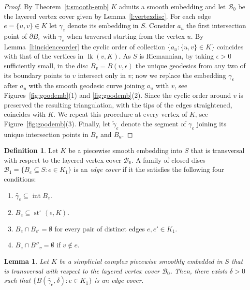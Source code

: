 \documentclass[11pt]{article}
\newtheorem{lemma}[theorem]{Lemma}
\numberwithin{claimcounter}{theorem}
\theoremstyle{remark}
\theoremstyle{definition}
\newtheorem{definition}[theorem]{Definition}
\numberwithin{theorem}{section}
\DeclareMathOperator{\st}{st}
\DeclareMathOperator{\interior}{int}
\DeclareMathOperator{\lk}{lk}
\begin{document}
\begin{proof}
    By Theorem~\ref{t:smooth-emb} $K$ admits a smooth embedding and 
    let $\mathcal{B}_0$ be the layered vertex cover given by Lemma~\ref{l:vertexdisc}. 
    For each edge $e=\{u,v\} \in K$ let $\gamma_e$ denote its embedding in $S$.
Consider $a_u$ the first intersection point of $\partial B_v$ with $\gamma_e$ when traversed starting from the vertex $u$.
By Lemma~\ref{l:incidenceorder} the cyclic order of collection $\{a_u\colon \{u,v\} \in K\}$ coincides with that of the vertices in $\lk(v,K)$.
As $S$ is Riemannian, by taking $\epsilon>0$ sufficiently small, in the disc $B_v=B(v,\epsilon)$ the unique geodesics from any two of its boundary points to $v$ intersect only in $v$; now we replace the embedding $\gamma_e$ after $a_u$ with the smooth geodesic curve joining $a_u$ with $v$, see Figures~\ref{fig:goodemb}(1) and \ref{fig:goodemb}(2).
Since the cyclic order around $v$ is preserved the resulting triangulation, with the tips of the edges straightened, coincides with $K$.
We repeat this procedure at every vertex of $K$, see Figure~\ref{fig:goodemb}(3).
Finally, let $\widetilde{\gamma}_e$ denote the segment of $\gamma_e$ joining its unique intersection points in $B_v$ and $B_u$.
\end{proof}
%
%
\begin{definition}
    Let $K$ be a piecewise smooth embedding into $S$ that is transversal with respect to the layered vertex cover $\mathcal{B}_0$. A family of closed discs $\mathcal{B}_1 = \{B_e \subseteq S\colon e\in K_1\}$ is an \emph{edge cover} if it the satisfies the following four conditions: 
    \begin{enumerate}
        \item $\widetilde{\gamma_e}\subseteq \interior B_e$.
        \item $B_e \subseteq \st^\circ(e,K)$.
        \item $B_e\cap B_{e'} = \emptyset$ for every pair of distinct edges $e,e'\in K_1$.
        \item $B_e\cap B''_v = \emptyset$ if $v\notin e$.
    \end{enumerate}
\end{definition}
%
\begin{lemma}
\label{l:edge-neigh}
    Let $K$ be a simplicial complex piecewise smoothly embedded in $S$ that is transversal with respect to the layered vertex cover $\mathcal{B}_0$. Then, there exists $\delta>0$ such that $\{B(\widetilde{\gamma_e},\delta) \colon e\in K_1\}$ is an edge cover.
\end{lemma}
\end{document}
